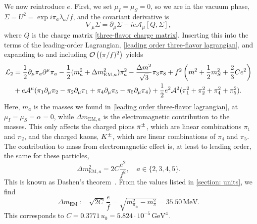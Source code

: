 We now reintroduce $e$.
First, we set $\mu_I = \mu_S = 0$, so we are in the vacuum phase, $\Sigma = U^2 = \exp{i \pi_a \lambda_a/f}$, and the covariant derivative is
%
\begin{equation}
    \nabla_\mu \Sigma = \partial_\mu \Sigma - i e \mathcal A_\mu [Q, \Sigma],
\end{equation}
%
where $Q$ is the charge matrix \autoref{three-flavor charge matrix}.
Inserting this into the terms of the leading-order Lagrangian, \autoref{leading order three-flavor lagrangian}, and expanding to and including $\mathcal O\left((\pi/f)^2\right)$ yields
%
\begin{align}
    \nonumber
    \mathcal{L}_2
    &= 
    \frac{1}{2} \partial_\mu \pi_a \partial^\mu \pi_a
    - \frac{1}{2}(m_{a}^2 + \Delta m_{\text{EM},a}^2)\pi_a^2
    - \frac{\Delta m^2}{\sqrt 3} \pi_3 \pi_8
    + f^2 \left(\bar m^2 + \frac{1}{2} m_S^2 + \frac{2}{3}C e^2\right)\\
    &+ e \mathcal A^\mu 
    (
        \pi_1 \partial_\mu \pi_2
        - \pi_2 \partial_\mu \pi_1
        + \pi_4 \partial_\mu \pi_5
        - \pi_5 \partial_\mu \pi_4
    )
    + \frac{1}{2} e^2 \mathcal A^2 (\pi_1^2 +\pi_2^2 + \pi_4^2 +\pi_5^2).
\end{align}
%
Here, $m_{a}$ is the masses  we found in \autoref{leading order three-flavor lagrangian}, at $\mu_I = \mu_S = \alpha = 0$, while $\Delta m_{\text{EM}, a}$ is the electromagnetic contribution to the masses.
This only affects the charged pions ${\pi^\pm}$, which are linear combinations $\pi_1$ and $\pi_2$, and the charged kaons, ${K^\pm}$, which are linear combinations of $\pi_4$ and $\pi_5$.
The contribution to mass from electromagnetic effect is, at least to leading order, the same for these particles,
%
\begin{equation}
    \Delta m_{\text{EM}, a}^2 = 2C \frac{e^2}{f^2}, \quad a \in \{2, 3, 4, 5\}.
\end{equation}
%
This is known as Dashen's theorem~\autocite{dashenChiralMathrmSUEnsuremath1969}.
From the values listed in \autoref{section: units}, we find
%
\begin{equation}
    \label{EM mass contribtuion leading order}
    \Delta m_{\text{EM}} := \sqrt{2C} \, \frac{e}{f} 
    = \sqrt{m_{\pi_\pm}^2 - m_{\pi}^2} = 35.50 \, \text{MeV}.
\end{equation}
%
This corresponds to $C = 0.3771 \, u_0 = 5.824 \cdot 10^{-5} \, \text{GeV}^4$.

